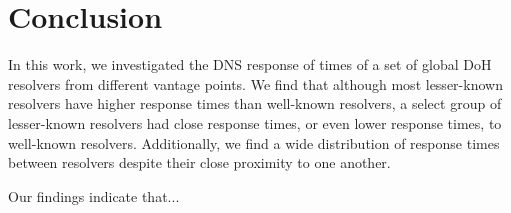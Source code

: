 \section{Conclusion}\label{sec:conclusion}
In this work, we investigated the DNS response of times of a set of global DoH resolvers from different vantage points.
We find that although most lesser-known resolvers have higher response times than well-known resolvers, a select group of lesser-known resolvers had close response times, or even lower response times, to well-known resolvers. 
Additionally, we find a wide distribution of response times between resolvers despite their close proximity to one another.  

Our findings indicate that...
